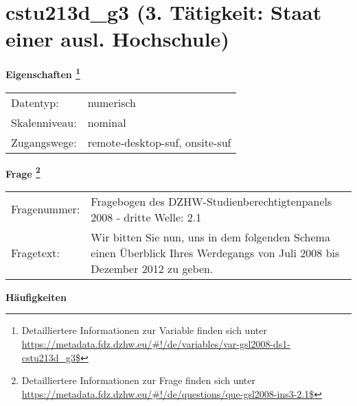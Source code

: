 
    \setcounter{footnote}{0}

    \vspace*{-1.8cm}
	\section{cstu213d\_g3 (3. Tätigkeit: Staat einer ausl. Hochschule)}
	\label{section:cstu213d_g3}



    \vspace*{0.5cm}
    \noindent\textbf{Eigenschaften
	\footnote{Detailliertere Informationen zur Variable finden sich unter
		\url{https://metadata.fdz.dzhw.eu/\#!/de/variables/var-gsl2008-ds1-cstu213d_g3$}}}\\
	\begin{tabularx}{\hsize}{@{}lX}
	Datentyp: & numerisch \\
	Skalenniveau: & nominal \\
	Zugangswege: &
	  remote-desktop-suf, 
	  onsite-suf
 \\
    \end{tabularx}



				\vspace*{0.5cm}
                \noindent\textbf{Frage
	                \footnote{Detailliertere Informationen zur Frage finden sich unter
		              \url{https://metadata.fdz.dzhw.eu/\#!/de/questions/que-gsl2008-ins3-2.1$}}}\\
				\begin{tabularx}{\hsize}{@{}lX}
					Fragenummer: &
					  Fragebogen des DZHW-Studienberechtigtenpanels 2008 - dritte Welle:
					  2.1
 \\
					Fragetext: & Wir bitten Sie nun, uns in dem folgenden Schema einen Überblick Ihres Werdegangs von Juli 2008 bis Dezember 2012 zu geben. \\
				\end{tabularx}





        		\vspace*{0.5cm}
                \noindent\textbf{Häufigkeiten}


